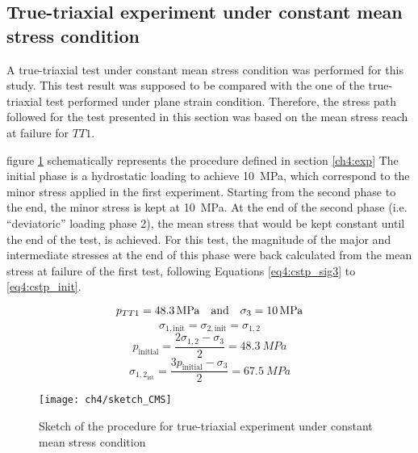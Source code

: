 \subsection{True-triaxial experiment under constant mean stress condition}

A true-triaxial test under constant mean stress condition was performed for this study. This test result was supposed to be compared with the one of the true-triaxial test performed under plane strain condition. Therefore, the stress path followed for the test presented in this section was based on the mean stress reach at failure for $TT1$.

figure \ref{fig4:16} schematically represents the procedure defined in section \ref{ch4:exp} The initial phase is a hydrostatic loading to achieve \SI{10}{MPa}, which correspond to the minor stress applied in the first experiment. Starting from the second phase to the end, the minor stress is kept at \SI{10}{MPa}. At the end of the second phase (i.e. “deviatoric” loading phase 2), the mean stress that would be kept constant until the end of the test, is achieved. For this test, the magnitude of the major and intermediate stresses at the end of this phase were back calculated from the mean stress at failure of the first test, following Equations \ref{eq4:cstp_sig3} to \ref{eq4:cstp_init}.

\begin{equation}\label{eq4:cstp_sig3}
    p_{TT1} = \SI{48.3}{MPa} \quad \textmd{and} \quad \sigma_3 = \SI{10}{MPa}
\end{equation}
\begin{equation}
    \sigma_{1,\text{init}} = \sigma_{2,\text{init}} = \sigma_{1,2}
\end{equation}
\begin{equation}
    p_\text{initial} = \frac{2\sigma_{1,2}-\sigma_3}{2} = \SI{48.3}{MPa}
\end{equation}
\begin{equation}\label{eq4:cstp_init}
    \sigma_{1,2_{\text{int}}} = \frac{3p_\text{initial}-\sigma_3}{2} = \SI{67.5}{MPa}
\end{equation}
    

\begin{figure}[tb]
    \centering
    \texttt{[image: ch4/sketch\_CMS]}
    \captionsetup{justification=centering}
    \caption{Sketch of the procedure for true-triaxial experiment under constant mean stress condition}
    \label{fig4:16}
\end{figure} 

